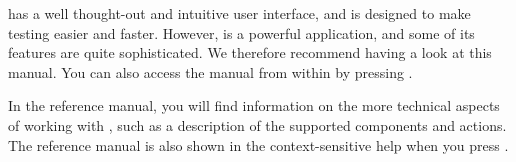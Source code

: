 \jb{} has a well thought-out and intuitive user interface, and is designed to make testing easier and faster. However,  \jb{} is a powerful application, and some of its features are quite sophisticated. We therefore recommend having a look at this manual. You can also access the manual from within \jb{} by pressing .  

In the reference manual, you will find information on the more technical aspects of working with \jb{}, such as a description of the supported components and actions. The reference manual is also shown in the context-sensitive help when you press . 



